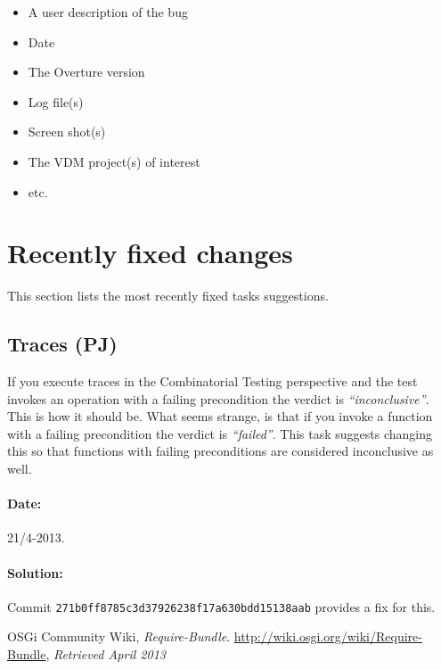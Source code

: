 \documentclass[11pt]{report}
\begin{document}
\begin{itemize}
\item A user description of the bug
\item Date
\item The Overture version
\item Log file(s)
\item Screen shot(s)
\item The VDM project(s) of interest
\item etc.
\end{itemize}

\section*{Recently fixed changes}

This section lists the most recently fixed tasks suggestions.

\subsection*{Traces (PJ)}

If you execute traces in the Combinatorial Testing perspective and the test invokes an operation with a failing precondition the verdict is \textit{``inconclusive''}. This is how it should be. What seems strange, is that if you invoke a function with a failing precondition the verdict is \textit{``failed''}. This task suggests changing this so that functions with failing preconditions are considered inconclusive as well.

\paragraph{Date:}
21/4-2013.

\paragraph{Solution:}
Commit \texttt{271b0ff8785c3d37926238f17a630bdd15138aab} provides a fix for this.

\begin{thebibliography}{9}

  OSGi Community Wiki,
  \emph{Require-Bundle}.
  \url{http://wiki.osgi.org/wiki/Require-Bundle},
  \emph{Retrieved April 2013}

\end{thebibliography}
\end{document}
